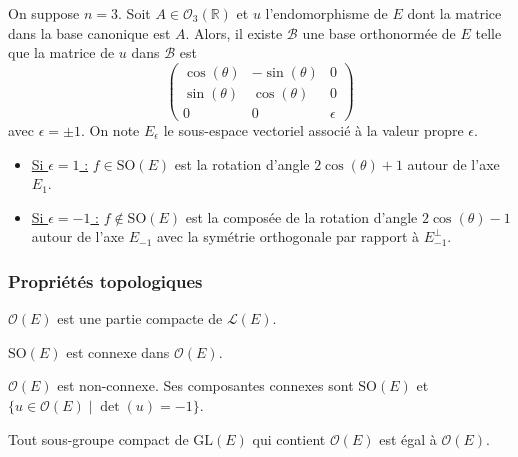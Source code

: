   \begin{theorem}
    On suppose $n = 3$. Soit $A \in \mathcal{O}_3(\mathbb{R})$ et $u$ l'endomorphisme de $E$ dont la matrice dans la base canonique est $A$. Alors, il existe $\mathcal{B}$ une base orthonormée de $E$ telle que la matrice de $u$ dans $\mathcal{B}$ est
    \[ \begin{pmatrix} \cos(\theta) & -\sin(\theta) & 0 \\ \sin(\theta) & \cos(\theta) & 0 \\ 0 & 0 & \epsilon \end{pmatrix} \]
    avec $\epsilon = \pm 1$. On note $E_\epsilon$ le sous-espace vectoriel associé à la valeur propre $\epsilon$.
    \begin{itemize}
      \item \underline{Si $\epsilon = 1$ :} $f \in \mathrm{SO}(E)$ est la rotation d'angle $2\cos(\theta) + 1$ autour de l'axe $E_1$.
      \item \underline{Si $\epsilon = -1$ :} $f \notin \mathrm{SO}(E)$ est la composée de la rotation d'angle $2\cos(\theta) - 1$ autour de l'axe $E_{-1}$ avec la symétrie orthogonale par rapport à $E_{-1}^{\perp}$.
    \end{itemize}
  \end{theorem}

  \subsubsection{Propriétés topologiques}


  \begin{proposition}
    $\mathcal{O}(E)$ est une partie compacte de $\mathcal{L}(E)$.
  \end{proposition}

  \begin{proposition}
    $\mathrm{SO}(E)$ est connexe dans $\mathcal{O}(E)$.
  \end{proposition}

  \begin{corollary}
    $\mathcal{O}(E)$ est non-connexe. Ses composantes connexes sont $\mathrm{SO}(E)$ et $\{ u \in \mathcal{O}(E) \mid \det(u) = -1 \}$.
  \end{corollary}


  \begin{proposition}
    Tout sous-groupe compact de $\mathrm{GL}(E)$ qui contient $\mathcal{O}(E)$ est égal à $\mathcal{O}(E)$.
  \end{proposition}

